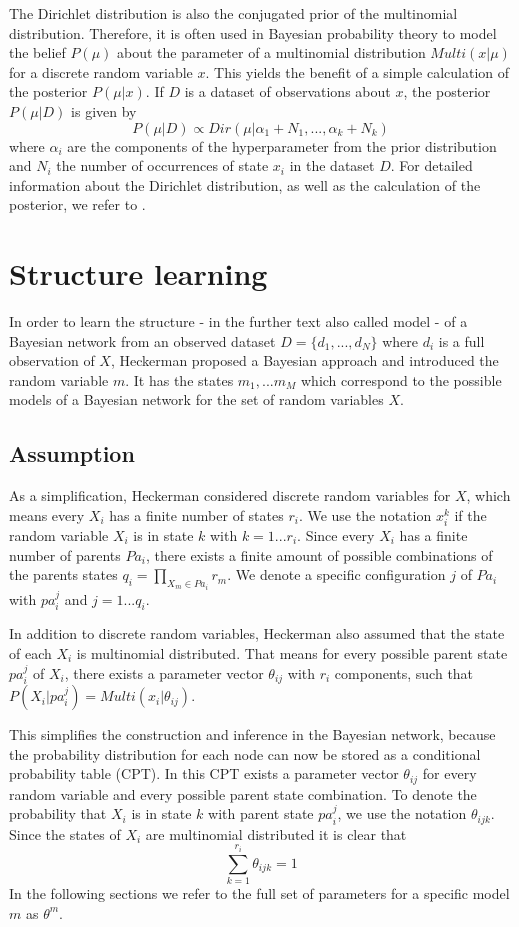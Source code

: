 \documentclass{article}
\begin{document}
	The Dirichlet distribution is also the conjugated prior of the multinomial distribution.
	Therefore, it is often used in Bayesian probability theory to model the belief $P(\mu)$ about the
	parameter of a multinomial distribution $Multi(x|\mu)$ for a discrete random variable $x$.
	This yields the benefit of a simple calculation of the posterior $P(\mu|x)$.
	If $D$ is a dataset of observations about $x$, the posterior $P(\mu|D)$
	is given by
	\[
		P(\mu|D) \propto Dir(\mu|\alpha_1+N_1, ..., \alpha_k+N_k)
	\]	
	where $\alpha_i$ are the components of the hyperparameter from the prior distribution
	and $N_i$ the number of occurrences of state $x_i$ in the dataset $D$.
	For detailed information about the Dirichlet distribution, as well as the calculation of the
	posterior, we refer to \cite{hcg}.

\section{Structure learning}
\label{sec:structure_learning}
	In order to learn the structure - in the further text also called model - of a Bayesian network 
	from an observed dataset $D=\{d_1,...,d_N\}$ where $d_i$ is a full observation of $X$,
	Heckerman \cite{original}	proposed a Bayesian approach 
	and introduced the random variable $m$. It has the states $m_1,...m_M$ which correspond to the 
	possible models of a Bayesian network for the set of random variables $X$.
	
	\subsection{Assumption}
	As a simplification, Heckerman considered discrete random variables for $X$, which means	every $X_i$ has a
	finite number of	states $r_i$. We use the notation $x_i^k$ if the random variable $X_i$ is in state $k$
	with $k = 1...r_i$. Since every $X_i$ has a finite number of parents $Pa_i$, there exists
	a finite amount of possible combinations of the parents states $q_i=\prod_{X_m \in Pa_i} r_m$.
	We denote a specific configuration $j$ of $Pa_i$ with $pa_i^j$ and $j=1...q_i$. 
	
	In addition	to discrete random variables, Heckerman also assumed that the state of each $X_i$
	is multinomial distributed. That means for every possible parent state $pa_i^j$ of $X_i$, there
	exists a parameter vector $\theta_{ij}$ with $r_i$ components,
	such that $P(X_i|pa_i^j)=Multi(x_i|\theta_{ij})$.
	
	This simplifies the construction and inference in the Bayesian network,	because the probability
  distribution for each node can now be stored as a conditional probability table (CPT). In this CPT
	exists a parameter vector $\theta_{ij}$ for every random variable and every possible parent state
	combination. To denote the probability that $X_i$ is in state $k$ with parent state $pa_i^j$, we
	use the notation $\theta_{ijk}$. Since the states of $X_i$ are multinomial distributed it is clear
	that
	\[
		\sum_{k=1}^{r_i} \theta_{ijk} = 1
	\]
	In the following sections we refer to the full set of parameters for a specific model $m$
	as $\theta^m$.	
	
\end{document}
